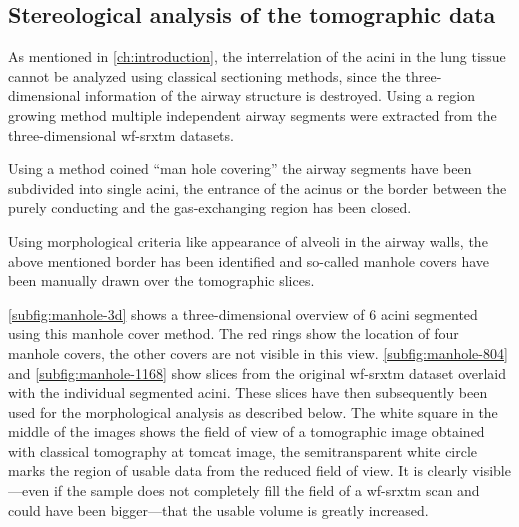 \subsection{Stereological analysis of the tomographic data\label{subsec:stereological analysis}}
As mentioned in \autoref{ch:introduction}, the interrelation of the acini in the lung tissue cannot be analyzed using classical sectioning methods, since the three-dimensional information of the airway structure is destroyed. Using a region growing method multiple independent airway segments were extracted from the three-dimensional \ac{wf-srxtm} datasets.

Using a method coined ``man hole covering'' the airway segments have been subdivided into single acini, \ie the entrance of the acinus or the border between the purely conducting and the gas-exchanging region has been closed. 

Using morphological criteria like appearance of alveoli in the airway walls, the above mentioned border has been identified and so-called manhole covers have been manually drawn over the tomographic slices. 

\autoref{subfig:manhole-3d} shows a three-dimensional overview of 6 acini segmented using this manhole cover method. The red rings show the location of four manhole covers, the other covers are not visible in this view. \autoref{subfig:manhole-804} and \ref{subfig:manhole-1168} show slices from the original \ac{wf-srxtm} dataset overlaid with the individual segmented acini. These slices have then subsequently been used for the morphological analysis as described below. The white square in the middle of the images shows the field of view of a tomographic image obtained with classical tomography at \ac{tomcat} image, the semitransparent white circle marks the region of usable data from the reduced field of view. It is clearly visible---even if the sample does not completely fill the field of a \ac{wf-srxtm} scan and could have been bigger---that the usable volume is greatly increased.

